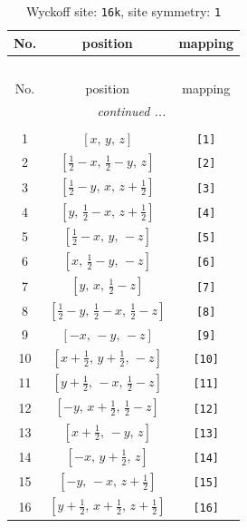 \documentclass[fleqn,8pt]{jsarticle}
\begin{document}
\begin{longtable}{ccc}
\caption{Wyckoff site: {\tt 16k}, site symmetry: {\tt 1}}
 \\
 \hline \hline
No. & position & mapping \\ \hline \endfirsthead

\multicolumn{2}{l}{\tablename\ \thetable{}} \\
 \hline \hline
No. & position & mapping \\ \hline \endhead

 \hline \hline
\multicolumn{2}{r}{\footnotesize\it continued ...} \\ \endfoot

 \hline \hline
\multicolumn{2}{r}{} \\ \endlastfoot

1 & $\left[ x,\, y,\, z \right]$ & {\tt [1]} \\ \hline
2 & $\left[ \frac{1}{2} - x,\, \frac{1}{2} - y,\, z \right]$ & {\tt [2]} \\ \hline
3 & $\left[ \frac{1}{2} - y,\, x,\, z + \frac{1}{2} \right]$ & {\tt [3]} \\ \hline
4 & $\left[ y,\, \frac{1}{2} - x,\, z + \frac{1}{2} \right]$ & {\tt [4]} \\ \hline
5 & $\left[ \frac{1}{2} - x,\, y,\, - z \right]$ & {\tt [5]} \\ \hline
6 & $\left[ x,\, \frac{1}{2} - y,\, - z \right]$ & {\tt [6]} \\ \hline
7 & $\left[ y,\, x,\, \frac{1}{2} - z \right]$ & {\tt [7]} \\ \hline
8 & $\left[ \frac{1}{2} - y,\, \frac{1}{2} - x,\, \frac{1}{2} - z \right]$ & {\tt [8]} \\ \hline
9 & $\left[ - x,\, - y,\, - z \right]$ & {\tt [9]} \\ \hline
10 & $\left[ x + \frac{1}{2},\, y + \frac{1}{2},\, - z \right]$ & {\tt [10]} \\ \hline
11 & $\left[ y + \frac{1}{2},\, - x,\, \frac{1}{2} - z \right]$ & {\tt [11]} \\ \hline
12 & $\left[ - y,\, x + \frac{1}{2},\, \frac{1}{2} - z \right]$ & {\tt [12]} \\ \hline
13 & $\left[ x + \frac{1}{2},\, - y,\, z \right]$ & {\tt [13]} \\ \hline
14 & $\left[ - x,\, y + \frac{1}{2},\, z \right]$ & {\tt [14]} \\ \hline
15 & $\left[ - y,\, - x,\, z + \frac{1}{2} \right]$ & {\tt [15]} \\ \hline
16 & $\left[ y + \frac{1}{2},\, x + \frac{1}{2},\, z + \frac{1}{2} \right]$ & {\tt [16]} \\
\end{longtable}
\end{document}
